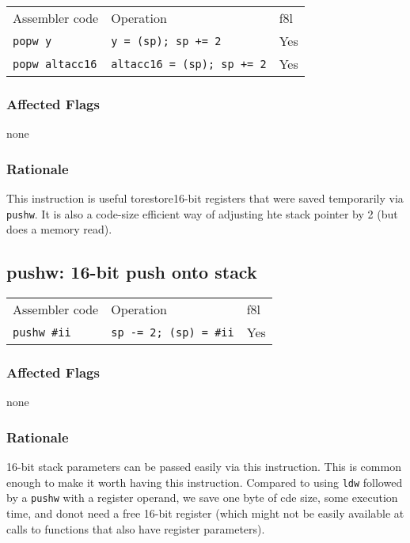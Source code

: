 \documentclass{book}
\begin{document}
\begin{tabular}{l l l}
Assembler code         & Operation                         & f8l \\
\texttt{popw y}        & \texttt{y = (sp); sp += 2}        & Yes \\
\texttt{popw altacc16} & \texttt{altacc16 = (sp); sp += 2} & Yes \\
\end{tabular}

\subsubsection*{Affected Flags}

none

\subsubsection*{Rationale}

This instruction is useful torestore16-bit registers that were saved temporarily via \texttt{pushw}. It is also a code-size efficient way of adjusting hte stack pointer by 2 (but does a memory read).


\subsection{pushw: 16-bit push onto stack}

\begin{tabular}{l l l}
Assembler code      & Operation                     & f8l \\
\texttt{pushw \#ii} & \texttt{sp -= 2; (sp) = \#ii} & Yes \\
\end{tabular}

\subsubsection*{Affected Flags}

none

\subsubsection*{Rationale}

16-bit stack parameters can be passed easily via this instruction. This is common enough to make it worth having this instruction. Compared to using \texttt{ldw} followed by a \texttt{pushw} with a register operand, we save one byte of cde size, some execution time, and donot need a free 16-bit register (which might not be easily available at calls to functions that also have register parameters).
\end{document}
